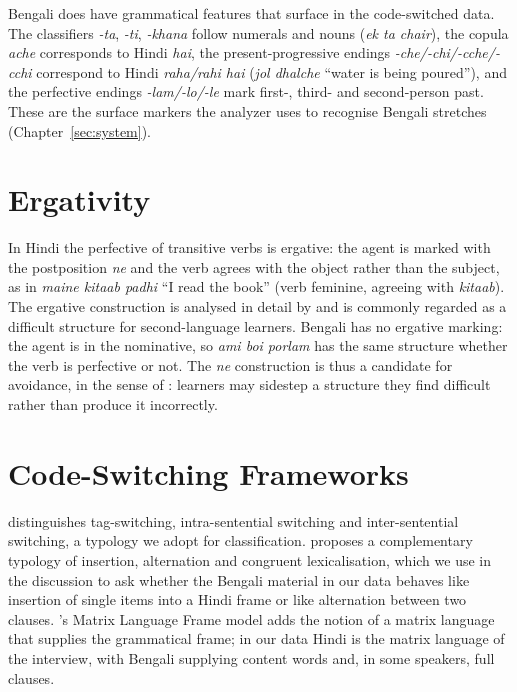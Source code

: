 \documentclass[11pt,a4paper]{report}
\begin{document}
Bengali does have grammatical features that surface in the code-switched data. The classifiers \textit{-ta}, \textit{-ti}, \textit{-khana} follow numerals and nouns (\textit{ek ta chair}), the copula \textit{ache} corresponds to Hindi \textit{hai}, the present-progressive endings \textit{-che/-chi/-cche/-cchi} correspond to Hindi \textit{raha/rahi hai} (\textit{jol dhalche} ``water is being poured''), and the perfective endings \textit{-lam/-lo/-le} mark first-, third- and second-person past. These are the surface markers the analyzer uses to recognise Bengali stretches (Chapter~\ref{sec:system}).

\section{Ergativity}

In Hindi the perfective of transitive verbs is ergative: the agent is marked with the postposition \textit{ne} and the verb agrees with the object rather than the subject, as in \textit{maine kitaab padhi} ``I read the book'' (verb feminine, agreeing with \textit{kitaab}). The ergative construction is analysed in detail by \citet{butt1995structure} and is commonly regarded as a difficult structure for second-language learners. Bengali has no ergative marking: the agent is in the nominative, so \textit{ami boi porlam} has the same structure whether the verb is perfective or not. The \textit{ne} construction is thus a candidate for avoidance, in the sense of \citet{schachter1974}: learners may sidestep a structure they find difficult rather than produce it incorrectly.

\section{Code-Switching Frameworks}

\citet{poplack1980sometimes} distinguishes tag-switching, intra-sentential switching and inter-sentential switching, a typology we adopt for classification. \citet{muysken2000bilingual} proposes a complementary typology of insertion, alternation and congruent lexicalisation, which we use in the discussion to ask whether the Bengali material in our data behaves like insertion of single items into a Hindi frame or like alternation between two clauses. \citet{myers1997duelling}'s Matrix Language Frame model adds the notion of a matrix language that supplies the grammatical frame; in our data Hindi is the matrix language of the interview, with Bengali supplying content words and, in some speakers, full clauses.
\end{document}
